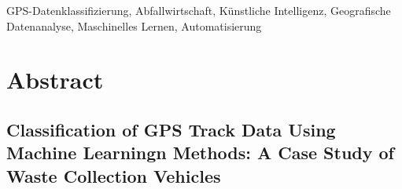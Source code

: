\documentclass[a4paper,12pt,twoside]{scrreprt}
\begin{document}

\vspace{0.5cm}

\noindent
GPS-Datenklassifizierung, Abfallwirtschaft, Künstliche Intelligenz,
Geografische Datenanalyse, Maschinelles Lernen, Automatisierung

\newpage
\section*{Abstract}
\subsection*{Classification of GPS Track Data Using Machine Learningn Methods:
  A Case Study of
  Waste Collection Vehicles}



\end{document}
